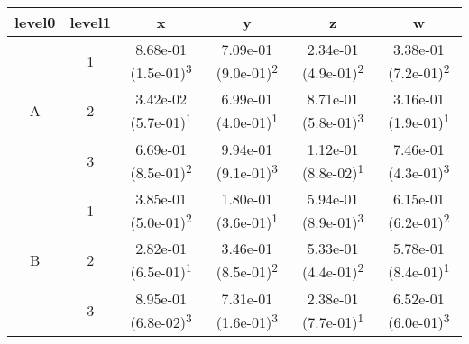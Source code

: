 \begin{tabular}{cccccc}
\toprule
level0 & level1&x&y&z&w\tabularnewline
\midrule
\multirow{3}{*}{A}&1& 8.68e-01 (1.5e-01)\textsuperscript{3}& 7.09e-01 (9.0e-01)\textsuperscript{2}& 2.34e-01 (4.9e-01)\textsuperscript{2}& 3.38e-01 (7.2e-01)\textsuperscript{2}\tabularnewline
&2& 3.42e-02 (5.7e-01)\textsuperscript{1}& 6.99e-01 (4.0e-01)\textsuperscript{1}& 8.71e-01 (5.8e-01)\textsuperscript{3}& 3.16e-01 (1.9e-01)\textsuperscript{1}\tabularnewline
&3& 6.69e-01 (8.5e-01)\textsuperscript{2}& 9.94e-01 (9.1e-01)\textsuperscript{3}& 1.12e-01 (8.8e-02)\textsuperscript{1}& 7.46e-01 (4.3e-01)\textsuperscript{3}\tabularnewline
\midrule
\multirow{3}{*}{B}&1& 3.85e-01 (5.0e-01)\textsuperscript{2}& 1.80e-01 (3.6e-01)\textsuperscript{1}& 5.94e-01 (8.9e-01)\textsuperscript{3}& 6.15e-01 (6.2e-01)\textsuperscript{2}\tabularnewline
&2& 2.82e-01 (6.5e-01)\textsuperscript{1}& 3.46e-01 (8.5e-01)\textsuperscript{2}& 5.33e-01 (4.4e-01)\textsuperscript{2}& 5.78e-01 (8.4e-01)\textsuperscript{1}\tabularnewline
&3& 8.95e-01 (6.8e-02)\textsuperscript{3}& 7.31e-01 (1.6e-01)\textsuperscript{3}& 2.38e-01 (7.7e-01)\textsuperscript{1}& 6.52e-01 (6.0e-01)\textsuperscript{3}\tabularnewline
\bottomrule
\end{tabular}
